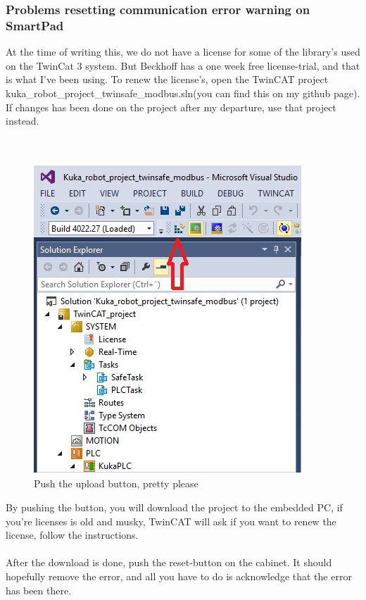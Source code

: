 \documentclass{article}
\begin{document}
    \subsubsection{Problems resetting communication error warning on SmartPad}
    At the time of writing this, we do not have a license for some of the library's used on the TwinCat 3 system. But Beckhoff has a one week free license-trial, and that is what I've been using. To renew the license's, open the TwinCAT project kuka\_robot\_project\_twinsafe\_modbus.sln(you can find this on my github page). If changes has been done on the project after my departure, use that project instead. 
    \\\\\
    \begin{figure}[!h]
        \centering
        \includegraphics[width=\textwidth]{Pictures/twincat_upload_installation.png}
        \caption{Push the upload button, pretty please}
        \end{figure}
    By pushing the button, you will download the project to the embedded PC, if you're licenses is old and musky, TwinCAT will ask if you want to renew the license, follow the instructions. 
    \\\\
    After the download is done, push the reset-button on the cabinet. It should hopefully remove the error, and all you have to do is acknowledge that the error has been there.  
\end{document}
